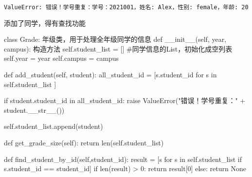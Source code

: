 \documentclass[
  letterpaper,
  DIV=11,
  numbers=noendperiod]{scrreprt}
\newenvironment{Shaded}{\begin{snugshade}}{\end{snugshade}}
\newcommand{\BuiltInTok}[1]{\textcolor[rgb]{0.00,0.23,0.31}{#1}}
\newcommand{\CommentTok}[1]{\textcolor[rgb]{0.37,0.37,0.37}{#1}}
\newcommand{\ControlFlowTok}[1]{\textcolor[rgb]{0.00,0.23,0.31}{#1}}
\newcommand{\DecValTok}[1]{\textcolor[rgb]{0.68,0.00,0.00}{#1}}
\newcommand{\FunctionTok}[1]{\textcolor[rgb]{0.28,0.35,0.67}{#1}}
\newcommand{\KeywordTok}[1]{\textcolor[rgb]{0.00,0.23,0.31}{#1}}
\newcommand{\NormalTok}[1]{\textcolor[rgb]{0.00,0.23,0.31}{#1}}
\newcommand{\OperatorTok}[1]{\textcolor[rgb]{0.37,0.37,0.37}{#1}}
\newcommand{\PreprocessorTok}[1]{\textcolor[rgb]{0.68,0.00,0.00}{#1}}
\newcommand{\StringTok}[1]{\textcolor[rgb]{0.13,0.47,0.30}{#1}}
\newcommand{\VariableTok}[1]{\textcolor[rgb]{0.07,0.07,0.07}{#1}}
\begin{document}
\begin{verbatim}
ValueError: 错误！学号重复：学号：2021001，姓名: Alex，性别: female，年龄: 20
\end{verbatim}

添加了同学，得有查找功能

\begin{Shaded}
\begin{Highlighting}[]
\KeywordTok{class}\NormalTok{ Grade:}
    \CommentTok{\textquotesingle{}\textquotesingle{}\textquotesingle{}}
\CommentTok{    年级类，用于处理全年级同学的信息}
\CommentTok{    \textquotesingle{}\textquotesingle{}\textquotesingle{}}
    \KeywordTok{def} \FunctionTok{\_\_init\_\_}\NormalTok{(}\VariableTok{self}\NormalTok{, year, campus):}
        \CommentTok{\textquotesingle{}\textquotesingle{}\textquotesingle{}}
\CommentTok{        构造方法}
\CommentTok{        \textquotesingle{}\textquotesingle{}\textquotesingle{}}
        \VariableTok{self}\NormalTok{.student\_list }\OperatorTok{=}\NormalTok{ [] }\CommentTok{\#同学信息的List，初始化成空列表}
        \VariableTok{self}\NormalTok{.year }\OperatorTok{=}\NormalTok{ year}
        \VariableTok{self}\NormalTok{.campus }\OperatorTok{=}\NormalTok{ campus}
    
    \KeywordTok{def}\NormalTok{ add\_student(}\VariableTok{self}\NormalTok{, student):}
\NormalTok{        all\_student\_id }\OperatorTok{=}\NormalTok{ [s.student\_id }\ControlFlowTok{for}\NormalTok{ s }\KeywordTok{in} \VariableTok{self}\NormalTok{.student\_list ]}
        
        \ControlFlowTok{if}\NormalTok{ student.student\_id }\KeywordTok{in}\NormalTok{ all\_student\_id:}
            \ControlFlowTok{raise} \PreprocessorTok{ValueError}\NormalTok{(}\StringTok{"错误！学号重复："} \OperatorTok{+}\NormalTok{ student.}\FunctionTok{\_\_str\_\_}\NormalTok{())}
        
        \VariableTok{self}\NormalTok{.student\_list.append(student)}

    \KeywordTok{def}\NormalTok{ get\_grade\_size(}\VariableTok{self}\NormalTok{):}
        \ControlFlowTok{return} \BuiltInTok{len}\NormalTok{(}\VariableTok{self}\NormalTok{.student\_list)}
    
    \KeywordTok{def}\NormalTok{ find\_student\_by\_id(}\VariableTok{self}\NormalTok{,student\_id):}
\NormalTok{        result }\OperatorTok{=}\NormalTok{ [s }\ControlFlowTok{for}\NormalTok{ s }\KeywordTok{in} \VariableTok{self}\NormalTok{.student\_list }\ControlFlowTok{if}\NormalTok{ s.student\_id }\OperatorTok{==}\NormalTok{ student\_id]}
        \ControlFlowTok{if} \BuiltInTok{len}\NormalTok{(result) }\OperatorTok{\textgreater{}} \DecValTok{0}\NormalTok{:}
            \ControlFlowTok{return}\NormalTok{ result[}\DecValTok{0}\NormalTok{]}
        \ControlFlowTok{else}\NormalTok{:}
            \ControlFlowTok{return} \VariableTok{None}
\end{Highlighting}
\end{Shaded}
\end{document}
